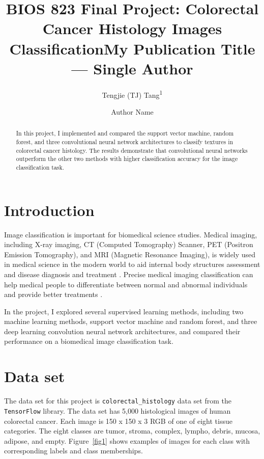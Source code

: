 \documentclass[letterpaper]{article} %
\title{BIOS 823 Final Project: Colorectal Cancer Histology Images Classification}
\author{
    Tengjie (TJ) Tang\textsuperscript{\rm 1}
}
\title{My Publication Title --- Single Author}
\author {
    Author Name
}
\begin{document}
\maketitle

\begin{abstract}

In this project, I implemented and compared the support vector machine, random forest, and three convolutional neural network architectures to classify textures in colorectal cancer histology. The results demonstrate that convolutional neural networks outperform the other two methods with higher classification accuracy for the image classification task. 

\end{abstract}

\section{Introduction}

Image classification is important for biomedical science studies. Medical imaging, including X-ray imaging, CT (Computed Tomography) Scanner, PET (Positron Emission Tomography), and MRI (Magnetic Resonance Imaging), is widely used in medical science in the modern world to aid internal body structures assessment and disease diagnosis and treatment \cite{Bajaj2018, ZHANG2019354, TchitoTchapga2021BiomedicalIC, hussain2022modern}. Precise medical imaging classification can help medical people to differentiate between normal and abnormal individuals and provide better treatments \cite{9669323}. 

In the project, I explored several supervised learning methods, including two machine learning methods, support vector machine and random forest, and three deep learning convolution neural network architectures, and compared their performance on a biomedical image classification task.

\section{Data set}

The data set for this project is \texttt{colorectal\_histology} \cite{kather2016multi} data set from the \texttt{TensorFlow} \cite{tensorflow2015-whitepaper} library. The data set has 5,000 histological images of human colorectal cancer. Each image is 150 x 150 x 3 RGB of one of eight tissue categories. The eight classes are tumor, stroma, complex, lympho, debris, mucosa, adipose, and empty. Figure~\ref{fig1} shows examples of images for each class with corresponding labels and class memberships.
\end{document}
